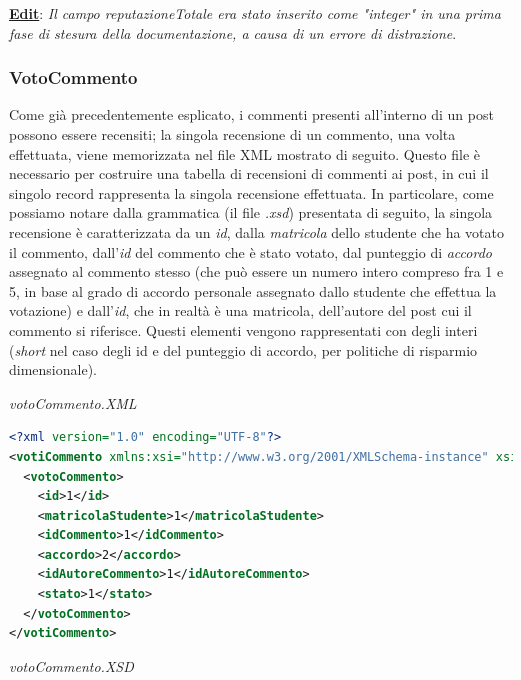 \documentclass [a4paper,11pt]{book}
\begin{document}
\textbf{\underline{Edit}}: \emph{Il campo reputazioneTotale era stato inserito come "integer" in una prima fase di stesura della documentazione, a causa di un errore di distrazione}.

\medskip

\subsubsection{VotoCommento}

Come già precedentemente esplicato, i commenti presenti all'interno di un post possono essere recensiti; la singola recensione di un commento, una volta effettuata, viene memorizzata nel file XML mostrato di seguito. Questo file è necessario per costruire una tabella di recensioni di commenti ai post, in cui il singolo record rappresenta la singola recensione effettuata. In particolare, come possiamo notare dalla grammatica (il file \emph{.xsd}) presentata di seguito, la singola recensione è caratterizzata da un \emph{id}, dalla \emph{matricola} dello studente che ha votato il commento, dall'\emph{id} del commento che è stato votato, dal punteggio di \emph{accordo} assegnato al commento stesso (che può essere un numero intero compreso fra 1 e 5, in base al grado di accordo personale assegnato dallo studente che effettua la votazione) e dall'\emph{id}, che in realtà è una matricola, dell'autore del post cui il commento si riferisce. Questi elementi vengono rappresentati con degli interi (\emph{short} nel caso degli id e del punteggio di accordo, per politiche di risparmio dimensionale).

\medskip

\emph{votoCommento.XML}

\label{sec:votoCommento}

\begin{lstlisting}[language=XML]
<?xml version="1.0" encoding="UTF-8"?>
<votiCommento xmlns:xsi="http://www.w3.org/2001/XMLSchema-instance" xsi:noNamespaceSchemaLocation="votoCommento.xsd">
  <votoCommento>
    <id>1</id>
    <matricolaStudente>1</matricolaStudente>
    <idCommento>1</idCommento>
    <accordo>2</accordo>
    <idAutoreCommento>1</idAutoreCommento>
    <stato>1</stato>
  </votoCommento>
</votiCommento>
\end{lstlisting}

\emph{votoCommento.XSD}
\end{document}
